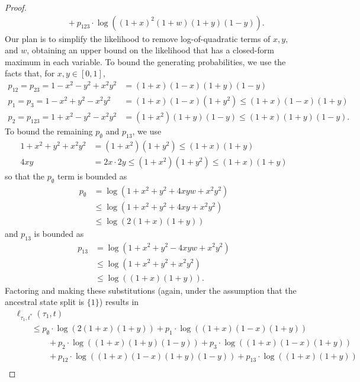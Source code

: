 \begin{proof}
\begin{align}
    &\qquad + p_{123}        \cdot\log((1+x)^2   (1+w)(1+y)(1-y)).
\end{align}
Our plan is to simplify the likelihood to remove log-of-quadratic terms of $x,y,$ and $w$, obtaining an upper bound on the likelihood that has a closed-form maximum in each variable.
To bound the generating probabilities, we use the facts that, for $x,y\in[0,1]$,
\begin{align*}
p_{12} = p_{23} = 1-x^2-y^2+x^2y^2 & = (1+x)(1-x)(1+y)(1-y) \\
p_{1} = p_{3} = 1-x^2+y^2-x^2y^2 & = (1+x)(1-x)(1+y^2) \le (1+x)(1-x)(1+y) \\
p_{2} = p_{123} = 1+x^2-y^2-x^2y^2 & = (1+x^2)(1+y)(1-y) \le (1+x)(1+y)(1-y).
\end{align*}
To bound the remaining $p_{\emptyset}$ and $p_{13}$, we use
\begin{align*}
1+x^2+y^2+x^2y^2 & = (1+x^2)(1+y^2) \le (1+x)(1+y) \\
4xy & = 2x \cdot 2y \le (1+x^2)(1+y^2) \le (1+x)(1+y)
\end{align*}
so that the $p_{\emptyset}$ term is bounded as
\begin{align*}
    p_{\emptyset} & = \log(1+x^2+y^2+4xyw+x^2y^2) \\
                  & \le \log(1+x^2+y^2+4xy+x^2y^2) \\
                  & \le \log(2(1+x)(1+y))
\end{align*}
and $p_{13}$ is bounded as
\begin{align*}
    p_{13} & = \log(1+x^2+y^2-4xyw+x^2y^2) \\
                  & \le \log(1+x^2+y^2+x^2y^2) \\
                  & \le \log((1+x)(1+y)).
\end{align*}
Factoring and making these substitutions (again, under the assumption that the ancestral state split is $\{1\}$) results in
\begin{align*}
&    \ell_{\tau_1,t^*}(\tau_1, t) \\
&\qquad \le      p_{\emptyset}  \cdot\log(2(1+x)(1+y))
+ p_{1}          \cdot\log((1+x)(1-x)(1+y)) \\
    &\qquad\qquad + p_{2}          \cdot\log((1+x)(1+y)(1-y))
+ p_{3}          \cdot\log((1+x)(1-x)(1+y)) \\
    &\qquad\qquad + p_{12}         \cdot\log((1+x)(1-x)(1+y)(1-y))
+ p_{13}         \cdot\log((1+x)(1+y)) \\

\end{align*}
\end{proof}
